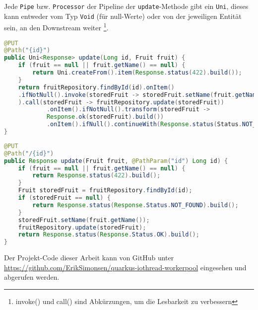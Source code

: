 Jede \verb|Pipe| bzw. \verb|Processor| der Pipeline der \verb|update|-Methode gibt ein \verb|Uni|, dieses kann entweder
vom Typ \verb|Void| (für null-Werte) oder von der jeweiligen Entität sein, an den Downstream weiter
\footnote{invoke() und call() sind Abkürzungen, um die Lesbarkeit zu verbessern\parencite{MutinyShortcuts}}.

\begin{lstlisting}[caption=Update Methode der reaktiven Anwendung, language=Java, captionpos=b, label=lst:update_reactive]
@PUT
@Path("{id}")
public Uni<Response> update(Long id, Fruit fruit) {
	if (fruit == null || fruit.getName() == null) {
		return Uni.createFrom().item(Response.status(422).build());
	}
	return fruitRepository.findById(id).onItem()
	.ifNotNull().invoke(storedFruit -> storedFruit.setName(fruit.getName())
	).call(storedFruit -> fruitRepository.update(storedFruit))
			.onItem().ifNotNull().transform(storedFruit ->
			Response.ok(storedFruit).build())
			.onItem().ifNull().continueWith(Response.status(Status.NOT_FOUND).build());
}
\end{lstlisting}
\begin{lstlisting}[caption=Update Methode der nicht-reaktiven Anwendung, language=Java, captionpos=b, label=lst:update_blocking]
@PUT
@Path("/{id}")
public Response update(Fruit fruit, @PathParam("id") Long id) {
	if (fruit == null || fruit.getName() == null) {
		return Response.status(422).build();
	}
	Fruit storedFruit = fruitRepository.findById(id);
	if (storedFruit == null) {
		return Response.status(Response.Status.NOT_FOUND).build();
	}
	storedFruit.setName(fruit.getName());
	fruitRepository.update(storedFruit);
	return Response.status(Response.Status.OK).build();
}
\end{lstlisting}

Der Projekt-Code dieser Arbeit kann von GitHub unter \url{https://github.com/ErikSimonsen/quarkus-iothread-workerpool} eingesehen und abgerufen werden.

